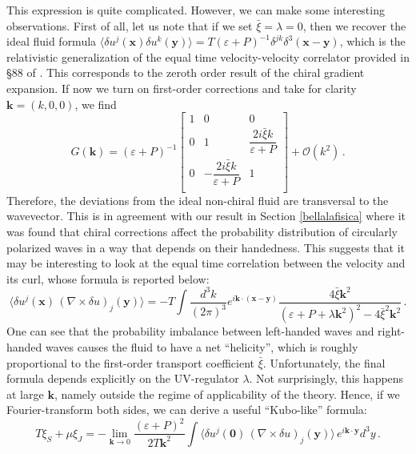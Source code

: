 \documentclass[a4paper, amsfonts, amssymb, amsmath, reprint, showkeys, nofootinbib, twoside,notitlepage,onecolumn,preprintnumbers]{revtex4-2}
\theoremstyle{definition}
\theoremstyle{theorem}
\theoremstyle{corollary}
\begin{document}
This expression is quite complicated. However, we can make some interesting observations. First of all, let us note that if we set $\bar{\xi}=\lambda=0$, then we recover the ideal fluid formula $\langle \delta u^j(\textbf{x})\delta u^k (\textbf{y})\rangle=T(\varepsilon{+}P)^{-1}\delta^{jk}\delta^3(\textbf{x}{-}\textbf{y})$, which is the relativistic generalization of the equal time velocity-velocity correlator provided in \S 88 of \cite{landau9}. This corresponds to the zeroth order result of the chiral gradient expansion. If now we turn on first-order corrections and take for clarity $\textbf{k}=(k,0,0)$, we find
\begin{equation}
    G(\textbf{k}) =(\varepsilon{+}P)^{-1} \begin{bmatrix}
      1 & 0 & 0 \\
       0 & 1 & \dfrac{2i\bar{\xi}k}{\varepsilon{+}P} \\
       0 & -\dfrac{2i\bar{\xi}k}{\varepsilon{+}P}  & 1 \\ 
    \end{bmatrix}+\mathcal{O}(k^2) \, .
\end{equation}
Therefore, the deviations from the ideal non-chiral fluid are transversal to the wavevector. This is in agreement with our result in Section \ref{bellalafisica} where it was found that chiral corrections affect the probability distribution of circularly polarized waves in a way that depends on their handedness. This suggests that it may be interesting to look at the equal time correlation between the velocity and its curl, whose formula is reported below:
\begin{equation}\label{jkm}
    \langle \delta u^j(\textbf{x}) \, (\nabla {\times} \delta u)_j(\textbf{y})\rangle  = - {T} \! \! \int \dfrac{d^3 k}{(2\pi)^3} e^{i\textbf{k}\cdot (\textbf{x}-\textbf{y})} \dfrac{4\bar{\xi}\textbf{k}^2}{(\varepsilon{+}P{+}\lambda \textbf{k}^2)^2{-}4\bar{\xi}^2\textbf{k}^2} \, .
\end{equation}
One can see that the probability imbalance between left-handed waves and right-handed waves causes the fluid to have a net ``helicity'', which is roughly proportional to the first-order transport coefficient $\bar{\xi}$. Unfortunately, the final formula depends explicitly on the UV-regulator $\lambda$. Not surprisingly, this happens at large $\textbf{k}$, namely outside the regime of applicability of the theory. Hence, if we Fourier-transform both sides, we can derive a useful ``Kubo-like'' formula:
\begin{equation}
    T\xi_S {+}\mu \xi_J = - \lim_{\textbf{k}\rightarrow 0}\dfrac{(\varepsilon{+}P)^2}{2T \textbf{k}^2} \int \langle \delta u^j(\textbf{0}) \, (\nabla {\times} \delta u)_j(\textbf{y})\rangle \, e^{i\textbf{k}\cdot \textbf{y}} d^3 y \, .
\end{equation}
\end{document}
